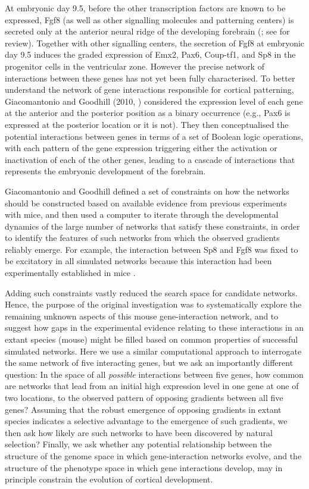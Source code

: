 \documentclass[10pt,letterpaper]{article}
\begin{document}
At embryonic day 9.5, before the other transcription factors are known to be expressed, Fgf8 (as well as other signalling molecules and patterning centers) is secreted only at the anterior neural ridge of the developing forebrain (\cite{Rakic2009}; see \cite{Greig2013} for review). Together with other signalling centers, the secretion of Fgf8 at embryonic day 9.5 induces the graded expression of Emx2, Pax6, Coup-tf1, and Sp8 in the progenitor cells in the ventricular zone. However the precise network of interactions between these genes has not yet been fully characterised. To better understand the network of gene interactions responsible for cortical patterning, Giacomantonio and Goodhill (2010, \cite{Giacomantonio2010}) considered the expression level of each gene at the anterior and the posterior position as a binary occurrence (e.g., Pax6 is expressed at the posterior location or it is not). They then conceptualised the potential interactions between genes in terms of a set of Boolean logic operations, with each pattern of the gene expression triggering either the activation or inactivation of each of the other genes, leading to a cascade of interactions that represents the embryonic development of the forebrain.

Giacomantonio and Goodhill defined a set of constraints on how the networks should be constructed based on available evidence from previous experiments with mice, and then used a computer to iterate through the developmental dynamics of the large number of networks that satisfy these constraints, in order to identify the features of such networks from which the observed gradients reliably emerge. For example, the interaction between Sp8 and Fgf8 was fixed to be excitatory in all simulated networks because this interaction had been experimentally established in mice \cite{Sahara2007}.

Adding such constraints vastly reduced the search space for candidate networks. Hence, the purpose of the original investigation was to systematically explore the remaining unknown aspects of this mouse gene-interaction network, and to suggest how gaps in the experimental evidence relating to these interactions in an extant species (mouse) might be filled based on  common properties of successful simulated networks. Here we use a similar computational approach to interrogate the same network of five interacting genes, but we ask an importantly different question: In the space of all \emph{possible} interactions between five genes, how common are networks that lead from an initial high expression level in one gene at one of two locations, to the observed pattern of opposing gradients between all five genes? Assuming that the robust emergence of opposing gradients in extant species indicates a selective advantage to the emergence of such gradients, we then ask how likely are such networks to have been discovered by natural selection? Finally, we ask whether any potential relationship between the structure of the genome space in which gene-interaction networks evolve, and the structure of the phenotype space in which gene interactions develop, may in principle constrain the evolution of cortical development.
\end{document}
